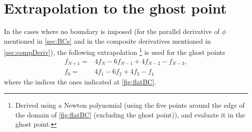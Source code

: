 \section{Extrapolation to the ghost point}
\label{sec:extrapolGhost}
%
In the cases where no boundary is imposed (for the parallel derivative of $\phi$ mentioned in \cref{sec:BCs} and in the composite derivatives mentioned in \cref{sec:compDeriv}), the following extrapolation %
%
\footnote{
Derived using a Newton polynomial (using the five points around the edge of the domain of \cref{fig:flatBC} (excluding the ghost point)), and evaluate it in the ghost point.
}%
is used for the ghost points
%
\begin{align}
    f_{N+1} =& 4f_{N} - 6f_{N-1} + 4f_{N-2} - f_{N-3},
    \label{eq:extraPolUp}
    \\
    f_{0} =& 4f_{1} - 6f_{2} + 4f_{3} - f_{4}
    \label{eq:extraPolDown}
\end{align}
%
where the indices the ones indicated at \cref{fig:flatBC}.
